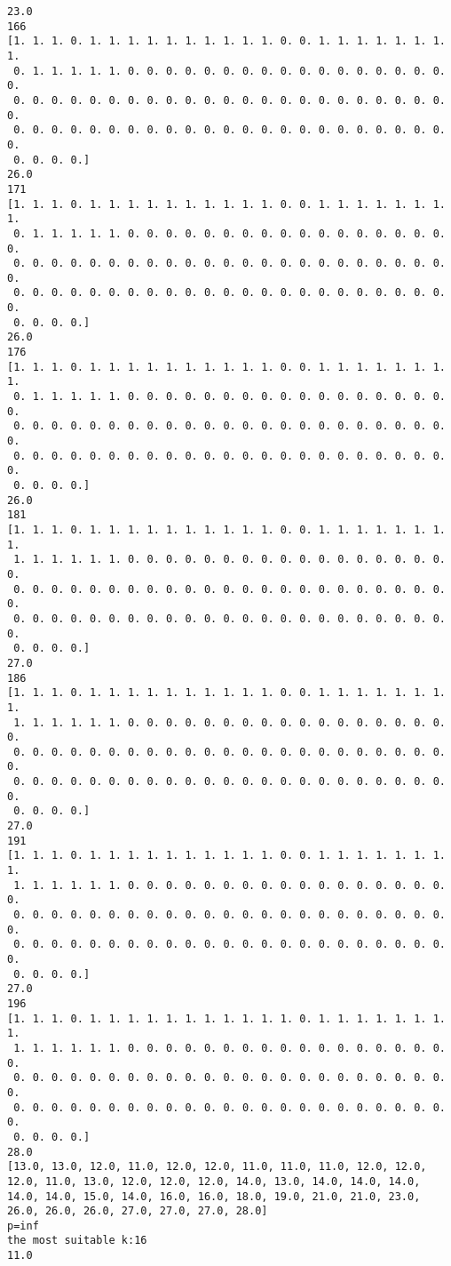 \documentclass[11pt]{article}
\begin{document}
\begin{Verbatim}[commandchars=\\\{\}]
23.0
166
[1. 1. 1. 0. 1. 1. 1. 1. 1. 1. 1. 1. 1. 1. 0. 0. 1. 1. 1. 1. 1. 1. 1. 1.
 0. 1. 1. 1. 1. 1. 0. 0. 0. 0. 0. 0. 0. 0. 0. 0. 0. 0. 0. 0. 0. 0. 0. 0.
 0. 0. 0. 0. 0. 0. 0. 0. 0. 0. 0. 0. 0. 0. 0. 0. 0. 0. 0. 0. 0. 0. 0. 0.
 0. 0. 0. 0. 0. 0. 0. 0. 0. 0. 0. 0. 0. 0. 0. 0. 0. 0. 0. 0. 0. 0. 0. 0.
 0. 0. 0. 0.]
26.0
171
[1. 1. 1. 0. 1. 1. 1. 1. 1. 1. 1. 1. 1. 1. 0. 0. 1. 1. 1. 1. 1. 1. 1. 1.
 0. 1. 1. 1. 1. 1. 0. 0. 0. 0. 0. 0. 0. 0. 0. 0. 0. 0. 0. 0. 0. 0. 0. 0.
 0. 0. 0. 0. 0. 0. 0. 0. 0. 0. 0. 0. 0. 0. 0. 0. 0. 0. 0. 0. 0. 0. 0. 0.
 0. 0. 0. 0. 0. 0. 0. 0. 0. 0. 0. 0. 0. 0. 0. 0. 0. 0. 0. 0. 0. 0. 0. 0.
 0. 0. 0. 0.]
26.0
176
[1. 1. 1. 0. 1. 1. 1. 1. 1. 1. 1. 1. 1. 1. 0. 0. 1. 1. 1. 1. 1. 1. 1. 1.
 0. 1. 1. 1. 1. 1. 0. 0. 0. 0. 0. 0. 0. 0. 0. 0. 0. 0. 0. 0. 0. 0. 0. 0.
 0. 0. 0. 0. 0. 0. 0. 0. 0. 0. 0. 0. 0. 0. 0. 0. 0. 0. 0. 0. 0. 0. 0. 0.
 0. 0. 0. 0. 0. 0. 0. 0. 0. 0. 0. 0. 0. 0. 0. 0. 0. 0. 0. 0. 0. 0. 0. 0.
 0. 0. 0. 0.]
26.0
181
[1. 1. 1. 0. 1. 1. 1. 1. 1. 1. 1. 1. 1. 1. 0. 0. 1. 1. 1. 1. 1. 1. 1. 1.
 1. 1. 1. 1. 1. 1. 0. 0. 0. 0. 0. 0. 0. 0. 0. 0. 0. 0. 0. 0. 0. 0. 0. 0.
 0. 0. 0. 0. 0. 0. 0. 0. 0. 0. 0. 0. 0. 0. 0. 0. 0. 0. 0. 0. 0. 0. 0. 0.
 0. 0. 0. 0. 0. 0. 0. 0. 0. 0. 0. 0. 0. 0. 0. 0. 0. 0. 0. 0. 0. 0. 0. 0.
 0. 0. 0. 0.]
27.0
186
[1. 1. 1. 0. 1. 1. 1. 1. 1. 1. 1. 1. 1. 1. 0. 0. 1. 1. 1. 1. 1. 1. 1. 1.
 1. 1. 1. 1. 1. 1. 0. 0. 0. 0. 0. 0. 0. 0. 0. 0. 0. 0. 0. 0. 0. 0. 0. 0.
 0. 0. 0. 0. 0. 0. 0. 0. 0. 0. 0. 0. 0. 0. 0. 0. 0. 0. 0. 0. 0. 0. 0. 0.
 0. 0. 0. 0. 0. 0. 0. 0. 0. 0. 0. 0. 0. 0. 0. 0. 0. 0. 0. 0. 0. 0. 0. 0.
 0. 0. 0. 0.]
27.0
191
[1. 1. 1. 0. 1. 1. 1. 1. 1. 1. 1. 1. 1. 1. 0. 0. 1. 1. 1. 1. 1. 1. 1. 1.
 1. 1. 1. 1. 1. 1. 0. 0. 0. 0. 0. 0. 0. 0. 0. 0. 0. 0. 0. 0. 0. 0. 0. 0.
 0. 0. 0. 0. 0. 0. 0. 0. 0. 0. 0. 0. 0. 0. 0. 0. 0. 0. 0. 0. 0. 0. 0. 0.
 0. 0. 0. 0. 0. 0. 0. 0. 0. 0. 0. 0. 0. 0. 0. 0. 0. 0. 0. 0. 0. 0. 0. 0.
 0. 0. 0. 0.]
27.0
196
[1. 1. 1. 0. 1. 1. 1. 1. 1. 1. 1. 1. 1. 1. 1. 0. 1. 1. 1. 1. 1. 1. 1. 1.
 1. 1. 1. 1. 1. 1. 0. 0. 0. 0. 0. 0. 0. 0. 0. 0. 0. 0. 0. 0. 0. 0. 0. 0.
 0. 0. 0. 0. 0. 0. 0. 0. 0. 0. 0. 0. 0. 0. 0. 0. 0. 0. 0. 0. 0. 0. 0. 0.
 0. 0. 0. 0. 0. 0. 0. 0. 0. 0. 0. 0. 0. 0. 0. 0. 0. 0. 0. 0. 0. 0. 0. 0.
 0. 0. 0. 0.]
28.0
[13.0, 13.0, 12.0, 11.0, 12.0, 12.0, 11.0, 11.0, 11.0, 12.0, 12.0, 12.0, 11.0, 13.0, 12.0, 12.0, 12.0, 14.0, 13.0, 14.0, 14.0, 14.0, 14.0, 14.0, 15.0, 14.0, 16.0, 16.0, 18.0, 19.0, 21.0, 21.0, 23.0, 26.0, 26.0, 26.0, 27.0, 27.0, 27.0, 28.0]
p=inf
the most suitable k:16
11.0

    \end{Verbatim}
\end{document}
